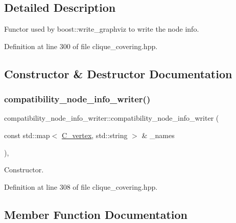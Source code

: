 \subsection{Detailed Description}
Functor used by boost\+::write\+\_\+graphviz to write the node info. 

Definition at line 300 of file clique\+\_\+covering.\+hpp.



\subsection{Constructor \& Destructor Documentation}
\mbox{\label{classcompatibility__node__info__writer_a794a8088e191394b66dfa93c90d28072}} 
\subsubsection{\texorpdfstring{compatibility\+\_\+node\+\_\+info\+\_\+writer()}{compatibility\_node\_info\_writer()}}
{\footnotesize\ttfamily compatibility\+\_\+node\+\_\+info\+\_\+writer\+::compatibility\+\_\+node\+\_\+info\+\_\+writer (\begin{DoxyParamCaption}\item[{const std\+::map$<$ \hyperlink{clique__covering__graph_8hpp_a9cb45047ea8c5ed95a8cfa90494345aa}{C\+\_\+vertex}, std\+::string $>$ \&}]{\+\_\+names }\end{DoxyParamCaption})\hspace{0.3cm}{\ttfamily [inline]}, {\ttfamily [explicit]}}



Constructor. 



Definition at line 308 of file clique\+\_\+covering.\+hpp.



\subsection{Member Function Documentation}
\mbox{\label{classcompatibility__node__info__writer_a5f6926af062452901bab46cd8c99d437}} 
